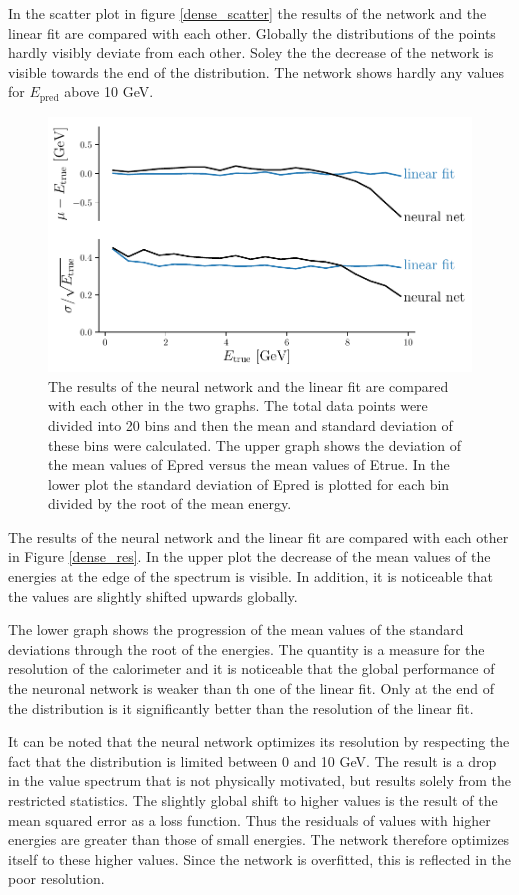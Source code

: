 \documentclass[12pt, a4paper]{thesis}
\begin{document}
In the scatter plot in figure \ref{dense_scatter} the results of the network and
the linear fit are compared with each other. Globally the distributions of the
points hardly visibly deviate from each other. Soley the the decrease of the
network is visible towards the end of the distribution.  The network shows
hardly any values for \(E_{\text{pred}}\) above 10 GeV.

\begin{figure}[htbp]
\centering
\includegraphics[width=.9\linewidth]{../images/dense_res.pdf}
\caption{\label{fig:org4b8f228}
The results of the neural network and the linear fit are compared with each other in the two graphs. The total data points were divided into 20 bins and then the mean and standard deviation of these bins were calculated. The upper graph shows the deviation of the mean values of Epred versus the mean values of Etrue. In the lower plot the standard deviation of Epred is plotted for each bin divided by the root of the mean energy.}
\end{figure} 

The results of the neural network and the linear fit are compared with each
other in Figure \ref{dense_res}. In the upper plot the decrease of the mean values
of the energies at the edge of the spectrum is visible. In addition, it is
noticeable that the values are slightly shifted upwards globally.

The lower graph shows the progression of the mean values of the standard
deviations through the root of the energies. The quantity is a measure for the
resolution of the calorimeter and it is noticeable that the global performance
of the neuronal network is weaker than th one of the linear fit. Only at the end
of the distribution is it significantly better than the resolution of the linear
fit.

It can be noted that the neural network optimizes its resolution by respecting
the fact that the distribution is limited between 0 and 10 GeV. The result is a
drop in the value spectrum that is not physically motivated, but results solely
from the restricted statistics.  The slightly global shift to higher values is
the result of the mean squared error as a loss function. Thus the residuals of
values with higher energies are greater than those of small energies. The
network therefore optimizes itself to these higher values. Since the network is
overfitted, this is reflected in the poor resolution.
\end{document}
